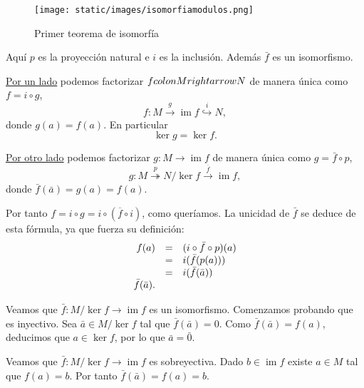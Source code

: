 \begin{figure}
\centering
\texttt{[image: static/images/isomorfiamodulos.png]}
\caption{Primer teorema de isomorfía}
\end{figure}

Aquí \(p\) es la proyección natural e \(i\) es la inclusión. Además
\(\bar f\) es un isomorfismo. 


\protect\hyperlink{factorimagemodules}{Por un lado} podemos factorizar
\(f\\colon M\\rightarrow N\) de manera única como \(f=i\circ g\),
\[f\colon M\stackrel{g}\rightarrow \operatorname{im} f\stackrel{i}\hookrightarrow N,\]
donde \(g(a)=f(a)\). En particular \[\ker g = \ker f.\]

\protect\hyperlink{factorquotientmodules}{Por otro lado} podemos
factorizar \(g\colon M\rightarrow \operatorname{im} f\) de manera única
como \(g=\bar f\circ p\),
\[g\colon M\stackrel{p}\twoheadrightarrow N/\ker f\stackrel{\overline{f}}\rightarrow \operatorname{im} f,\]
donde \(\bar f(\bar{a})=g(a)=f(a)\).

Por tanto \(f=i\circ g= i\circ(\overline{f}\circ i)\), como queríamos.
La unicidad de \(\bar f\) se deduce de esta fórmula, ya que fuerza su
definición: \[
\begin{array}{rcl}
f(a)&=&(i\circ\bar f\circ p)(a)\cr
&=&i(\bar{f}(p(a)))\cr
&=&i(\bar{f}(\bar{a}))\cr
\bar{f}(\bar{a}).
\end{array}
\]

Veamos que \(\bar f\colon M/\ker f\rightarrow \operatorname{im} f\) es
un isomorfismo. Comenzamos probando que es inyectivo. Sea
\(\bar{a}\in M/\ker f\) tal que \(\bar f(\bar{a})=0\). Como
\(\bar f(\bar{a})=f(a)\), deducimos que \(a\in \ker f\), por lo que
\(\bar{a}=\bar{0}\).

Veamos que \(\bar f\colon M/\ker f\rightarrow \operatorname{im} f\) es
sobreyectiva. Dado \(b\in\operatorname{im} f\) existe \(a\in M\) tal que
\(f(a)=b\). Por tanto \(\bar f(\bar{a})=f(a)=b\).\\

